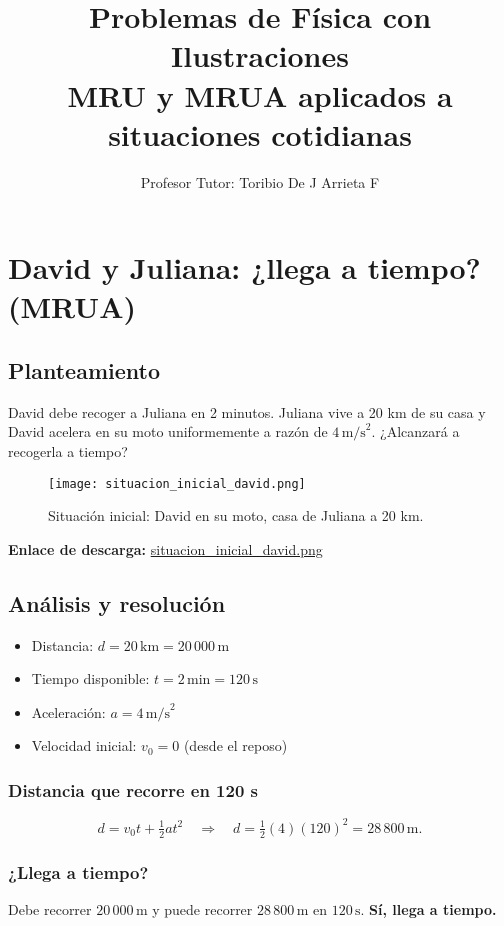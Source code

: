 \documentclass[12pt,a4paper,openany]{book} %
\title{\Huge Problemas de Física con Ilustraciones\\[2mm]
\Large MRU y MRUA aplicados a situaciones cotidianas}
\author{\Large Profesor Tutor: Toribio De J Arrieta F}
\date{}
\begin{document}
\maketitle
\tableofcontents
\listoffigures

\chapter{David y Juliana: ¿llega a tiempo? (MRUA)}

\section{Planteamiento}
David debe recoger a Juliana en 2 minutos. Juliana vive a 20 km de su casa y David acelera en su moto uniformemente a razón de \(4\,\text{m/s}^2\). ¿Alcanzará a recogerla a tiempo?

\begin{figure}[h!]
  \centering
  \texttt{[image: situacion\_inicial\_david.png]}
  \caption{Situación inicial: David en su moto, casa de Juliana a 20 km.}
\end{figure}
\noindent\textbf{Enlace de descarga:} \href{run:imagenes/situacion_inicial_david.png}{situacion\_inicial\_david.png}

\section{Análisis y resolución}
\begin{itemize}[leftmargin=1.3cm]
  \item Distancia: \(d=20\,\text{km}=20\,000\,\text{m}\)
  \item Tiempo disponible: \(t=2\,\text{min}=120\,\text{s}\)
  \item Aceleración: \(a=4\,\text{m/s}^2\)
  \item Velocidad inicial: \(v_0=0\) (desde el reposo)
\end{itemize}

\subsection{Distancia que recorre en 120 s}
\[
d = v_0 t + \tfrac{1}{2} a t^2
\quad\Rightarrow\quad
d = \tfrac{1}{2}(4)(120)^2 = 28\,800\,\text{m}.
\]

\subsection{¿Llega a tiempo?}
Debe recorrer \(20\,000\,\text{m}\) y puede recorrer \(28\,800\,\text{m}\) en \(120\,\text{s}\).
\textbf{Sí, llega a tiempo.}
\end{document}

